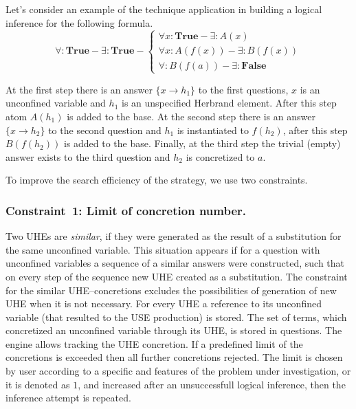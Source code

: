 \documentclass[runningheads,a4paper]{llncs}
\begin{document}
Let's consider an example of the technique application in building a logical inference for the following formula.
\begin{equation*}
  \forall\colon\boldsymbol{True} - \exists\colon\boldsymbol{True} -
  \left\lbrace
  \begin{array}{l}
    \forall x\colon\boldsymbol{True} - \exists\colon A(x) \\
    \forall x\colon A(f(x)) - \exists\colon B(f(x)) \\
    \forall\colon B(f(a)) - \exists\colon \boldsymbol{False}
  \end{array}\right.
\end{equation*}

At the first step there is an answer $\{x \rightarrow h_1\}$ to the first questions, $x$ is an unconfined variable and $h_1$ is an unspecified Herbrand element. After this step atom $A(h_1)$ is added to the base. At the second step there is an answer $\{x \rightarrow h_2\}$ to the second question and $h_1$ is instantiated to $f(h_2)$, after this step $B(f(h_2))$ is added to the base. Finally, at the third step the trivial (empty) answer exists to the third question and $h_2$ is concretized to $a$.

To improve the search efficiency of the strategy, we use two constraints.

\subsubsection{Constraint~1: Limit of concretion number.}

Two UHEs are \emph{similar}, if they were generated as the result of a substitution for the same unconfined variable. This situation appears if for a question with unconfined variables a sequence of a similar answers were constructed, such that on every step of the sequence new UHE created as a substitution. The constraint for the similar UHE--concretions excludes the possibilities of generation of new UHE when it is not necessary. For every UHE a reference to its unconfined variable (that resulted to the USE production) is stored. The set of terms, which concretized an unconfined variable through its UHE, is stored in questions. The engine allows tracking the UHE concretion. If a predefined limit of the concretions is exceeded then all further concretions rejected. The limit is chosen by user according to a specific and features of the problem under investigation, or it is denoted as $1$, and increased after an unsuccessfull logical inference, then the inference attempt is repeated.
\end{document}
